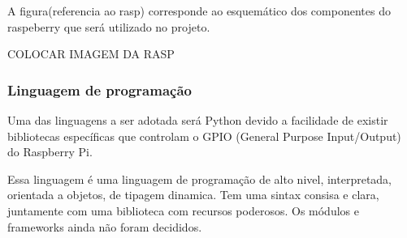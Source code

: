 A figura(referencia ao rasp) corresponde ao esquemático dos componentes do raspeberry que será utilizado no projeto.

COLOCAR IMAGEM DA RASP

\subsubsection{Linguagem de programação}

Uma das linguagens a ser adotada será Python devido a facilidade de existir bibliotecas específicas que controlam o GPIO (General Purpose Input/Output) do Raspberry Pi.

Essa linguagem é uma linguagem de programação de alto nivel, interpretada, orientada a objetos, de tipagem dinamica. Tem uma sintax consisa e clara, juntamente com uma biblioteca com recursos poderosos. Os módulos e frameworks ainda não foram decididos.
